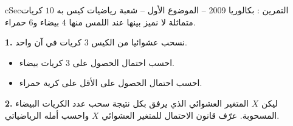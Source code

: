 \documentclass[12pt,a4paper]{article}
\newenvironment{BOX}[2]{\begin{otherlanguage}{english}\begin{arbox}{#1}{#2}}{\end{arbox}\end{otherlanguage}}
\newcounter{exo}
\newenvironment{tamrin}[1]{\stepcounter{exo}\begin{BOX}{cSec}{التمرين \theexo: #1}}{\end{BOX}}
\newenvironment{sq}{\begin{itemize}[leftmargin=2.4em,itemsep=3pt]}{\end{itemize}}
\newcommand{\qa}{\item[(أ)]}\newcommand{\qb}{\item[(ب)]}\newcommand{\qc}{\item[(جـ)]}\newcommand{\qd}{\item[(د)]}\newcommand{\qe}{\item[(هـ)]}
\newcommand{\QQ}[1]{\par\smallskip\textbf{#1.} }
\begin{document}
\begin{tamrin}{بكالوريا 2009 -- الموضوع الأول -- شعبة رياضيات}
كيس به $10$ كريات متماثلة لا نميز بينها عند اللمس منها $4$ بيضاء و$6$ حمراء.

\QQ{1} نسحب عشوائيا من الكيس $3$ كريات في آن واحد.
\begin{sq}
\qa احسب احتمال الحصول على $3$ كريات بيضاء.
\qb احسب احتمال الحصول على الأقل على كرية حمراء.
\end{sq}
\QQ{2} ليكن $X$ المتغير العشوائي الذي يرفق بكل نتيجة سحب عدد الكريات البيضاء المسحوبة.
عرّف قانون الاحتمال للمتغير العشوائي $X$ واحسب أمله الرياضياتي.
\end{tamrin}
\end{document}
